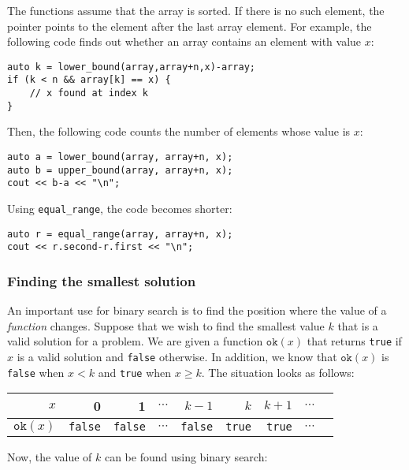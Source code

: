 The functions assume that the array is sorted.
If there is no such element, the pointer points to
the element after the last array element.
For example, the following code finds out whether
an array contains an element with value $x$:

\begin{lstlisting}
auto k = lower_bound(array,array+n,x)-array;
if (k < n && array[k] == x) {
    // x found at index k
}
\end{lstlisting}

Then, the following code counts the number of elements
whose value is $x$:

\begin{lstlisting}
auto a = lower_bound(array, array+n, x);
auto b = upper_bound(array, array+n, x);
cout << b-a << "\n";
\end{lstlisting}

Using \texttt{equal\_range}, the code becomes shorter:

\begin{lstlisting}
auto r = equal_range(array, array+n, x);
cout << r.second-r.first << "\n";
\end{lstlisting}

\subsubsection{Finding the smallest solution}

An important use for binary search is
to find the position where the value of a \emph{function} changes.
Suppose that we wish to find the smallest value $k$
that is a valid solution for a problem.
We are given a function $\texttt{ok}(x)$
that returns \texttt{true} if $x$ is a valid solution
and \texttt{false} otherwise.
In addition, we know that $\texttt{ok}(x)$ is \texttt{false}
when $x<k$ and \texttt{true} when $x \ge k$.
The situation looks as follows:

\begin{center}
\begin{tabular}{r|rrrrrrrr}
$x$ & 0 & 1 & $\cdots$ & $k-1$ & $k$ & $k+1$ & $\cdots$ \\
\hline
$\texttt{ok}(x)$ & \texttt{false} & \texttt{false}
& $\cdots$ & \texttt{false} & \texttt{true} & \texttt{true} & $\cdots$ \\
\end{tabular}
\end{center}

\noindent
Now, the value of $k$ can be found using binary search:


